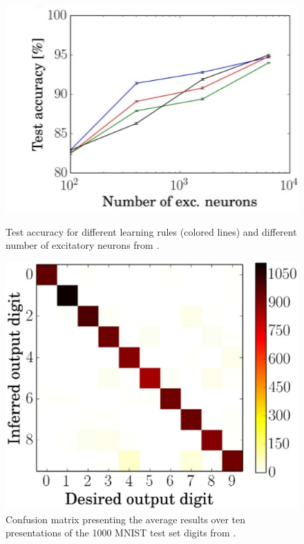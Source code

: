 \begin{figure}[http]
    \begin{minipage}[b]{.5\linewidth}
         \includegraphics[width=\linewidth]{pictures/num_exc_neurons_test_acc.jpg}
         \caption{Test accuracy for different learning rules (colored lines) and different number of excitatory neurons from \cite{SNN}.}
         \label{img:test_acc}
    \end{minipage}
    \hspace{0.06\linewidth}%
    \begin{minipage}[b]{.4\linewidth}
         \includegraphics[width=\linewidth]{pictures/error_analysis_confusion_matrix.jpg}
         \caption{Confusion matrix presenting the average results over ten presentations of the 1000 MNIST test set digits from \cite{SNN}.}
         \label{img:error_analysis}
    \end{minipage}
\end{figure}

